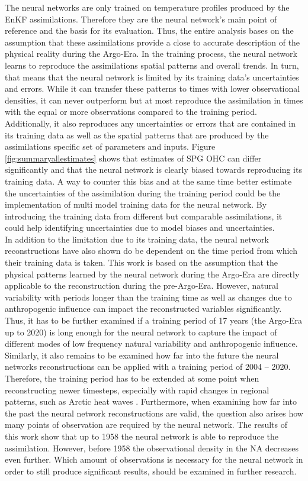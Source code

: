 \documentclass[Masterarbeit.tex]{subfile}
\begin{document}
	The neural networks are only trained on temperature profiles produced by the EnKF assimilations. Therefore they are the neural network's main point of reference and the basis for its evaluation. Thus, the entire analysis bases on the assumption that these assimilations provide a close to accurate description of the physical reality during the Argo-Era. In the training process, the neural network learns to reproduce the assimilations spatial patterns and overall trends. In turn, that means that the neural network is limited by its training data's uncertainties and errors. While it can transfer these patterns to times with lower observational densities, it can never outperform but at most reproduce the assimilation in times with the equal or more observations compared to the training period. Additionally, it also reproduces any uncertainties or errors that are contained in its training data as well as the spatial patterns that are produced by the assimilations specific set of parameters and inputs. Figure \ref{fig:summaryallestimates} shows that estimates of SPG OHC can differ significantly and that the neural network is clearly biased towards reproducing its training data. A way to counter this bias and at the same time better estimate the uncertainties of the assimilation during the training period could be the implementation of multi model training data for the neural network. By introducing the training data from different but comparable assimilations, it could help identifying uncertainties due to model biases and uncertainties. \\
	In addition to the limitation due to its training data, the neural network reconstructions have also shown do be dependent on the time period from which their training data is taken. This work is based on the assumption that the physical patterns learned by the neural network during the Argo-Era are directly applicable to the reconstruction during the pre-Argo-Era. However, natural variability with periods longer than the training time as well as changes due to anthropogenic influence can impact the reconstructed variables significantly. Thus, it has to be further examined if a training period of 17 years (the Argo-Era up to 2020) is long enough for the neural network to capture the impact of different modes of low frequency natural variability and anthropogenic influence. Similarly, it also remains to be examined how far into the future the neural networks reconstructions can be applied with a training period of 2004 -- 2020. Therefore, the training period has to be extended at some point when reconstructing newer timesteps, especially with rapid changes in regional patterns, such as Arctic heat waves \citep{barkhordarian_recent_2022}. Furthermore, when examining how far into the past the neural network reconstructions are valid, the question also arises how many points of observation are required by the neural network. The results of this work show that up to 1958 the neural network is able to reproduce the assimilation. However, before 1958 the observational density in the NA decreases even further. Which amount of observations is necessary for the neural network in order to still produce significant results, should be examined in further research. \\	
\end{document}
